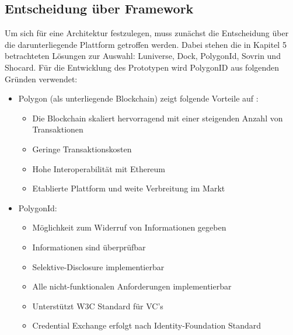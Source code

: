 \subsection{Entscheidung über Framework}
Um sich für eine Architektur festzulegen, muss zunächst die Entscheidung über die darunterliegende Plattform getroffen werden. Dabei stehen die in Kapitel 5 betrachteten Lösungen zur Auswahl: Luniverse, Dock, PolygonId, Sovrin und Shocard. Für die Entwicklung des Prototypen wird PolygonID aus folgenden Gründen verwendet:
\begin{itemize}
	
	\item Polygon (als unterliegende Blockchain) zeigt folgende Vorteile auf \cite{ID54}:
	\begin{itemize}
		\item Die Blockchain skaliert hervorragend mit einer steigenden Anzahl von Transaktionen
		\item Geringe Transaktionskosten
		\item Hohe Interoperabilität mit Ethereum
		\item Etablierte Plattform und weite Verbreitung im Markt
	\end{itemize}
	
	\item PolygonId:
	\begin{itemize}
		\item Möglichkeit zum Widerruf von Informationen gegeben
		\item Informationen sind überprüfbar
		\item Selektive-Disclosure implementierbar
		\item Alle nicht-funktionalen Anforderungen implementierbar
		\item Unterstützt W3C Standard für VC's
		\item Credential Exchange erfolgt nach Identity-Foundation Standard
	\end{itemize}
\end{itemize}

